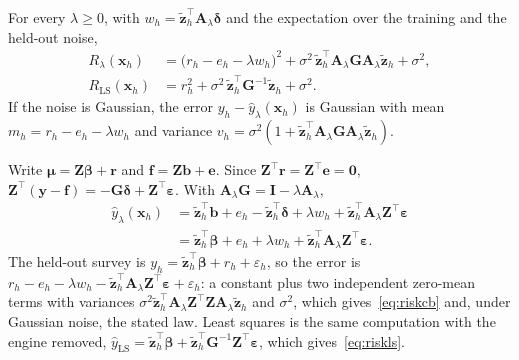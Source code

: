 \begin{theorem}\label{thm:risk}
For every $\lambda\ge0$, with $w_h=\tilde{\mathbf z}_h^{\top}\mathbf A_\lambda\boldsymbol\delta$ and the expectation over the
training and the held-out noise,
\begin{align}
R_\lambda(\mathbf x_h)&=\big(r_h-e_h-\lambda w_h\big)^2+\sigma^2\,\tilde{\mathbf z}_h^{\top}\mathbf A_\lambda\mathbf G\mathbf
A_\lambda\tilde{\mathbf z}_h+\sigma^2,\label{eq:riskcb}\\
R_{\mathrm{LS}}(\mathbf x_h)&=r_h^2+\sigma^2\,\tilde{\mathbf z}_h^{\top}\mathbf G^{-1}\tilde{\mathbf z}_h+\sigma^2.\label{eq:riskls}
\end{align}
If the noise is Gaussian, the error $y_h-\hat y_\lambda(\mathbf x_h)$ is Gaussian with mean $m_h=r_h-e_h-\lambda w_h$ and
variance $v_h=\sigma^2(1+\tilde{\mathbf z}_h^{\top}\mathbf A_\lambda\mathbf G\mathbf A_\lambda\tilde{\mathbf z}_h)$.
\end{theorem}
\begin{IEEEproof}
Write $\boldsymbol\mu=\mathbf Z\boldsymbol\beta+\mathbf r$ and $\mathbf f=\mathbf Z\mathbf b+\mathbf e$. Since $\mathbf
Z^{\top}\mathbf r=\mathbf Z^{\top}\mathbf e=\mathbf 0$, $\mathbf Z^{\top}(\mathbf y-\mathbf f)=-\mathbf G\boldsymbol\delta+\mathbf
Z^{\top}\boldsymbol\varepsilon$. With $\mathbf A_\lambda\mathbf G=\mathbf I-\lambda\mathbf A_\lambda$,
\begin{align*}
\hat y_\lambda(\mathbf x_h)&=\tilde{\mathbf z}_h^{\top}\mathbf b+e_h-\tilde{\mathbf z}_h^{\top}\boldsymbol\delta+\lambda w_h
+\tilde{\mathbf z}_h^{\top}\mathbf A_\lambda\mathbf Z^{\top}\boldsymbol\varepsilon\\
&=\tilde{\mathbf z}_h^{\top}\boldsymbol\beta+e_h+\lambda w_h+\tilde{\mathbf z}_h^{\top}\mathbf A_\lambda\mathbf Z^{\top}\boldsymbol\varepsilon .
\end{align*}
The held-out survey is $y_h=\tilde{\mathbf z}_h^{\top}\boldsymbol\beta+r_h+\varepsilon_h$, so the error is
$r_h-e_h-\lambda w_h-\tilde{\mathbf z}_h^{\top}\mathbf A_\lambda\mathbf Z^{\top}\boldsymbol\varepsilon+\varepsilon_h$: a constant
plus two independent zero-mean terms with variances $\sigma^2\tilde{\mathbf z}_h^{\top}\mathbf A_\lambda\mathbf Z^{\top}\mathbf
Z\mathbf A_\lambda\tilde{\mathbf z}_h$ and $\sigma^2$, which gives~\eqref{eq:riskcb} and, under Gaussian noise, the stated law.
Least squares is the same computation with the engine removed, $\hat y_{\mathrm{LS}}=\tilde{\mathbf z}_h^{\top}\boldsymbol\beta+\tilde{\mathbf
z}_h^{\top}\mathbf G^{-1}\mathbf Z^{\top}\boldsymbol\varepsilon$, which gives~\eqref{eq:riskls}.
\end{IEEEproof}

